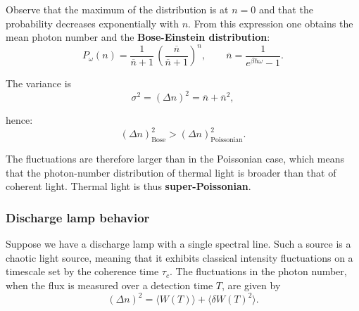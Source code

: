 Observe that the maximum of the distribution is at $n=0$ and that the probability decreases exponentially with $n$. From this expression one obtains the mean photon number and the \textbf{Bose-Einstein distribution}:
\[
P_{\omega}(n)= \frac{1}{\overline{n}+1}\, \left(\frac{\overline{n}}{\overline{n}+1}\right)^n,
\qquad
\overline{n}=\frac{1}{e^{\beta\hbar\omega}-1}.
\]

The variance is
\[
\sigma^2 = (\Delta n)^2 = \overline{n}+\overline{n}^2,
\]

hence:
\begin{equation}\label{eqn:7-super-poissonian-variance}
(\Delta n)^2_{\text{Bose}} > (\Delta n)^2_{\text{Poissonian}}.
\end{equation}

The fluctuations are therefore larger than in the Poissonian case, which means that the photon-number distribution of thermal light is broader than that of coherent light. Thermal light is thus \textbf{super-Poissonian}.


\subsubsection{Discharge lamp behavior}\label{subsubsec:7-discharge-lamp-behavior}

Suppose we have a discharge lamp with a single spectral line. Such a source is a chaotic light source, meaning that it exhibits classical intensity fluctuations on a timescale set by the coherence time $\tau_c$. The fluctuations in the photon number, when the flux is measured over a detection time $T$, are given by
\begin{equation}\label{eqn:7-fluctuations-discharge-lamp}
(\Delta n)^2 = \langle W(T)\rangle + \langle \delta W(T)^2\rangle.
\end{equation}

